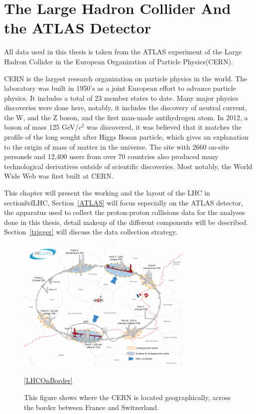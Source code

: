 \chapter{The Large Hadron Collider And the ATLAS Detector}
\label{chapter:ATLAS}

All data used in this thesis is taken from the ATLAS experiment of the Large Hadron Collider in the European Organization of Particle Physics(CERN).

CERN is the largest research organization on particle physics in the world. The laboratory was built in 1950's as a joint European effort to advance particle physics. It includes a total of 23 member states to date. Many major physics discoveries were done here, notably, it includes the discovery of neutral current, the W, and the Z boson, and the first man-made antihydrogen atom. In 2012, a boson of mass 125 GeV/$c^{2}$ was discovered, it was believed that it matches the profile of the long sought after Higgs Boson particle, which gives an explanation to the origin of mass of matter in the universe. The site with 2660 on-site personels and 12,400 users from over 70 countries also produced many technological derivatives outside of scientific discoveries. Most notably, the World Wide Web was first built at CERN.

This chapter will present the working and the layout of the LHC in section\~ref{LHC}, Section~\ref{ATLAS} will focus especially on the ATLAS detector, the apparatus used to collect the proton-proton collisions data for the analyses done in this thesis, detail makeup of the different components will be described. Section~\ref{trigger} will discuss the data collection strategy.

\begin{figure}[!htb]
    \begin{center}
        \includegraphics[width=0.75\textwidth]{figures/chapter_ATLAS/LHCOnBorder}
        \caption{
			This figure shows where the CERN is located geographically, across the border between France and Switzerland. \cite{Brüning:782076} 
        }
        \label{fig:CERNAcceleratorComplex}
        \ref{LHCOnBorder}
    \end{center}
\end{figure}

